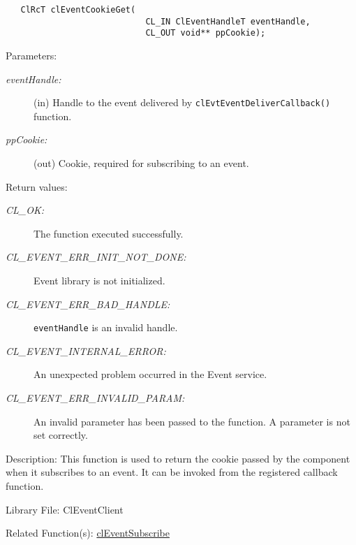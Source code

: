 \begin{flushleft}
\begin{Desc}
\footnotesize\begin{verbatim}   ClRcT clEventCookieGet(
              				CL_IN ClEventHandleT eventHandle,
			                CL_OUT void** ppCookie);
\end{verbatim}
\normalsize
\end{Desc}
\begin{Desc}
\item[Parameters:]
\begin{description}
\item[{\em event\-Handle:}](in) Handle to the event delivered by {\tt{cl\-Evt\-Event\-Deliver\-Callback()}} function.\par
\item[{\em pp\-Cookie:}](out) Cookie, required for subscribing to an event.\end{description}
\end{Desc}
\begin{Desc}
\item[Return values:]
\begin{description}
\item[{\em CL\_\-OK:}]The function executed successfully. 
\item[{\em CL\_\-EVENT\_\-ERR\_\-INIT\_\-NOT\_\-DONE:}]Event library is not initialized. 
\item[{\em CL\_\-EVENT\_\-ERR\_\-BAD\_\-HANDLE:}]{\tt{eventHandle}} is an invalid handle. 
\item[{\em CL\_\-EVENT\_\-INTERNAL\_\-ERROR:}]An unexpected problem occurred in the Event service. 
\item[{\em CL\_\-EVENT\_\-ERR\_\-INVALID\_\-PARAM:}]An invalid parameter has been passed to the function. A parameter is not set correctly.
\end{description}
\end{Desc}
\begin{Desc}
\item[Description:]This function is used to return the cookie passed by the component when it subscribes to an event. It can be invoked from the 
registered callback function. 
\end{Desc}
\begin{Desc}
\item[Library File:]Cl\-Event\-Client\end{Desc}
\begin{Desc}
\item[Related Function(s):]\hyperlink{pageem114}{cl\-Event\-Subscribe} \end{Desc}
\newpage



\end{flushleft}
